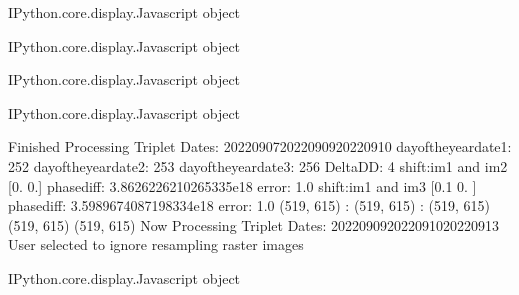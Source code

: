 \documentclass[letterpaper,10pt]{sphinxmanual}
\begin{document}
\begin{sphinxVerbatim}[commandchars=\\\{\}]
\PYGZlt{}IPython.core.display.Javascript object\PYGZgt{}
\end{sphinxVerbatim}



\begin{sphinxVerbatim}[commandchars=\\\{\}]
\PYGZlt{}IPython.core.display.Javascript object\PYGZgt{}
\end{sphinxVerbatim}



\begin{sphinxVerbatim}[commandchars=\\\{\}]
\PYGZlt{}IPython.core.display.Javascript object\PYGZgt{}
\end{sphinxVerbatim}



\begin{sphinxVerbatim}[commandchars=\\\{\}]
\PYGZlt{}IPython.core.display.Javascript object\PYGZgt{}
\end{sphinxVerbatim}



\begin{sphinxVerbatim}[commandchars=\\\{\}]
Finished Processing Triplet Dates:  20220907\PYGZhy{}20220909\PYGZhy{}20220910
day\PYGZus{}of\PYGZus{}the\PYGZus{}year\PYGZus{}date1:  252
\PYGZhy{}\PYGZhy{}\PYGZhy{}\PYGZhy{}\PYGZhy{}\PYGZhy{}\PYGZhy{}\PYGZhy{}\PYGZhy{}\PYGZhy{}\PYGZhy{}\PYGZhy{}\PYGZhy{}\PYGZhy{}\PYGZhy{}\PYGZhy{}\PYGZhy{}\PYGZhy{}\PYGZhy{}\PYGZhy{}\PYGZhy{}
day\PYGZus{}of\PYGZus{}the\PYGZus{}year\PYGZus{}date2:  253
\PYGZhy{}\PYGZhy{}\PYGZhy{}\PYGZhy{}\PYGZhy{}\PYGZhy{}\PYGZhy{}\PYGZhy{}\PYGZhy{}\PYGZhy{}\PYGZhy{}\PYGZhy{}\PYGZhy{}\PYGZhy{}\PYGZhy{}\PYGZhy{}\PYGZhy{}\PYGZhy{}\PYGZhy{}\PYGZhy{}\PYGZhy{}
day\PYGZus{}of\PYGZus{}the\PYGZus{}year\PYGZus{}date3:  256
\PYGZhy{}\PYGZhy{}\PYGZhy{}\PYGZhy{}\PYGZhy{}\PYGZhy{}\PYGZhy{}\PYGZhy{}\PYGZhy{}\PYGZhy{}\PYGZhy{}\PYGZhy{}\PYGZhy{}\PYGZhy{}\PYGZhy{}\PYGZhy{}\PYGZhy{}\PYGZhy{}\PYGZhy{}\PYGZhy{}\PYGZhy{}
Delta\PYGZus{}DD: 4
shift:im1 and im2 [0. 0.] phasediff: 3.8626226210265335e\PYGZhy{}18 error: 1.0
shift:im1 and im3 [0.1 0. ] phasediff: 3.5989674087198334e\PYGZhy{}18 error: 1.0
(519, 615) :  (519, 615) :  (519, 615)
(519, 615)
(519, 615)
Now Processing Triplet Dates:  20220909\PYGZhy{}20220910\PYGZhy{}20220913
 User selected to ignore resampling raster images 



\PYGZlt{}IPython.core.display.Javascript object\PYGZgt{}
\end{sphinxVerbatim}
\end{document}
